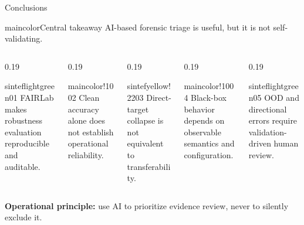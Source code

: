 \documentclass{beamer}
\begin{document}
\begin{frame}{Conclusions}
\centering

\begin{colorblock}[white]{maincolor}{Central takeaway}
\centering
\Large
AI-based forensic triage is useful, but it is not self-validating.
\end{colorblock}

\vspace{0.28cm}

\begin{columns}[T,onlytextwidth]

\begin{column}{0.19\textwidth}
\begin{colorblock}[black]{sinteflightgreen}{01}
\centering
\scriptsize FAIRLab makes robustness evaluation reproducible and auditable.
\end{colorblock}
\end{column}

\begin{column}{0.19\textwidth}
\begin{colorblock}[black]{maincolor!10}{02}
\centering
\scriptsize Clean accuracy alone does not establish operational reliability.
\end{colorblock}
\end{column}

\begin{column}{0.19\textwidth}
\begin{colorblock}[black]{sintefyellow!22}{03}
\centering
\scriptsize Direct-target collapse is not equivalent to transferability.
\end{colorblock}
\end{column}

\begin{column}{0.19\textwidth}
\begin{colorblock}[black]{maincolor!10}{04}
\centering
\scriptsize Black-box behavior depends on observable semantics and configuration.
\end{colorblock}
\end{column}

\begin{column}{0.19\textwidth}
\begin{colorblock}[black]{sinteflightgreen}{05}
\centering
\scriptsize OOD and directional errors require validation-driven human review.
\end{colorblock}
\end{column}

\end{columns}

\vspace{0.45cm}

\centering
\small
\textbf{Operational principle:} use AI to prioritize evidence review, never to silently exclude it.
\end{frame}
\end{document}
